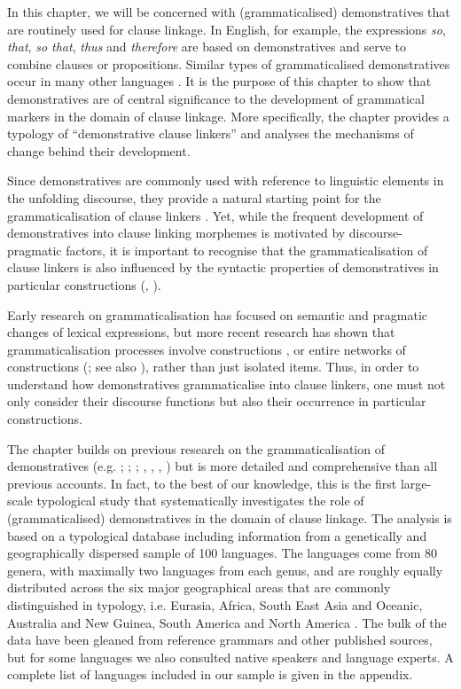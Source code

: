 \documentclass[output=paper,colorlinks,citecolor=brown]{langscibook}
\begin{document}
In this chapter, we will be concerned with (grammaticalised) demonstratives that are routinely used for clause linkage. In English, for example, the expressions \textit{so}, \textit{that}, \textit{so that}, \textit{thus} and \textit{therefore} are based on demonstratives and serve to combine clauses or propositions. Similar types of grammaticalised demonstratives occur in many other languages \citep{Himmelmann1997,HeineKuteva2007}. It is the purpose of this chapter to show that demonstratives are of central significance to the development of grammatical markers in the domain of clause linkage. More specifically, the chapter provides a typology of “demonstrative clause linkers” and analyses the mechanisms of change behind their development. 

Since demonstratives are commonly used with reference to linguistic elements in the unfolding discourse, they provide a natural starting point for the grammaticalisation of clause linkers \citep{Bühler1934,Diessel2012}. Yet, while the frequent development of demonstratives into clause linking morphemes is motivated by discourse-pragmatic factors, it is important to recognise that the grammaticalisation of clause linkers is also influenced by the syntactic properties of demonstratives in particular constructions (\citealt{Himmelmann1997,Diessel1999Book}, \citeyear{Diessel1999Article}).

Early research on grammaticalisation has focused on semantic and pragmatic changes of lexical expressions, but more recent research has shown that grammaticalisation processes involve constructions \citep{Traugott2003}, or entire networks of constructions (\citealt{TraugottTrousdale2013}; see also \citealt{Diessel2019Adverbials}), rather than just isolated items. Thus, in order to understand how demonstratives grammaticalise into clause linkers, one must not only consider their discourse functions but also their occurrence in particular constructions. 

The chapter builds on previous research on the grammaticalisation of demonstratives (e.g. \citealt{Brugmann1904}; \citealt{Bühler1934}; \citealt{Himmelmann1997}; \citealt{Diessel1999Book}, \citeyear{Diessel1999Article}, \citeyear{Diessel2006}, \citeyear{Diessel2014}) but is more detailed and comprehensive than all previous accounts. In fact, to the best of our knowledge, this is the first large-scale typological study that systematically investigates the role of (grammaticalised) demonstratives in the domain of clause linkage. The analysis is based on a typological database including information from a genetically and geographically dispersed sample of 100 languages. The languages come from 80 genera, with maximally two languages from each genus, and are roughly equally distributed across the six major geographical areas that are commonly distinguished in typology, i.e. Eurasia, Africa, South East Asia and Oceanic, Australia and New Guinea, South America and North America \citep{Dryer1992}. The bulk of the data have been gleaned from reference grammars and other published sources, but for some languages we also consulted native speakers and language experts. A complete list of languages included in our sample is given in the appendix.
\end{document}
